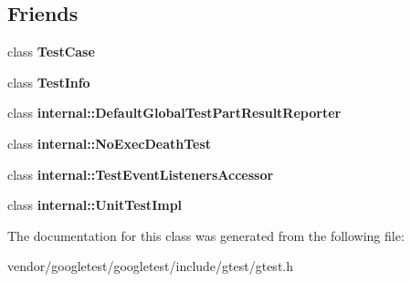\subsection*{Friends}
\begin{DoxyCompactItemize}
\item 
class {\bfseries Test\+Case}\hypertarget{classtesting_1_1TestEventListeners_aff779e55b06adfa7c0088bd10253f0f0}{}\label{classtesting_1_1TestEventListeners_aff779e55b06adfa7c0088bd10253f0f0}

\item 
class {\bfseries Test\+Info}\hypertarget{classtesting_1_1TestEventListeners_a4c49c2cdb6c328e6b709b4542f23de3c}{}\label{classtesting_1_1TestEventListeners_a4c49c2cdb6c328e6b709b4542f23de3c}

\item 
class {\bfseries internal\+::\+Default\+Global\+Test\+Part\+Result\+Reporter}\hypertarget{classtesting_1_1TestEventListeners_abae39633da9932847b41cb80efd62115}{}\label{classtesting_1_1TestEventListeners_abae39633da9932847b41cb80efd62115}

\item 
class {\bfseries internal\+::\+No\+Exec\+Death\+Test}\hypertarget{classtesting_1_1TestEventListeners_afddba49fdf3f493532b4d5efb9814f4e}{}\label{classtesting_1_1TestEventListeners_afddba49fdf3f493532b4d5efb9814f4e}

\item 
class {\bfseries internal\+::\+Test\+Event\+Listeners\+Accessor}\hypertarget{classtesting_1_1TestEventListeners_addbc107b6b445617c880182bd4f44cf9}{}\label{classtesting_1_1TestEventListeners_addbc107b6b445617c880182bd4f44cf9}

\item 
class {\bfseries internal\+::\+Unit\+Test\+Impl}\hypertarget{classtesting_1_1TestEventListeners_acc0a5e7573fd6ae7ad1878613bb86853}{}\label{classtesting_1_1TestEventListeners_acc0a5e7573fd6ae7ad1878613bb86853}

\end{DoxyCompactItemize}


The documentation for this class was generated from the following file\+:\begin{DoxyCompactItemize}
\item 
vendor/googletest/googletest/include/gtest/gtest.\+h\end{DoxyCompactItemize}
